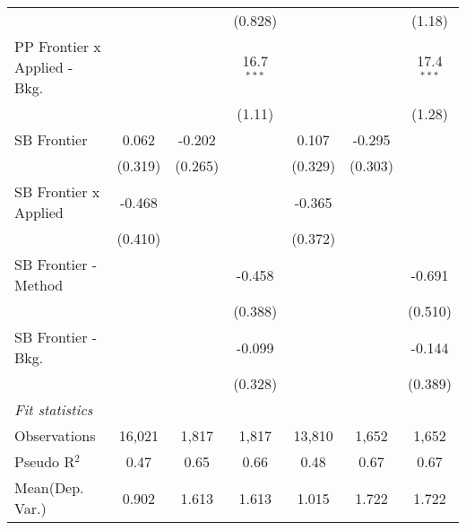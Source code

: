 \begin{tabular}{lcccccc}
                                &                &               & (0.828)       &                &               & (1.18)\\   
   PP Frontier x Applied - Bkg. &                &               & 16.7$^{***}$  &                &               & 17.4$^{***}$\\   
                                &                &               & (1.11)        &                &               & (1.28)\\   
   SB Frontier                  & 0.062          & -0.202        &               & 0.107          & -0.295        &   \\   
                                & (0.319)        & (0.265)       &               & (0.329)        & (0.303)       &   \\   
   SB Frontier x Applied        & -0.468         &               &               & -0.365         &               &   \\   
                                & (0.410)        &               &               & (0.372)        &               &   \\   
   SB Frontier - Method         &                &               & -0.458        &                &               & -0.691\\   
                                &                &               & (0.388)       &                &               & (0.510)\\   
   SB Frontier - Bkg.           &                &               & -0.099        &                &               & -0.144\\   
                                &                &               & (0.328)       &                &               & (0.389)\\   
   \midrule
   \emph{Fit statistics}\\
   Observations                 & 16,021         & 1,817         & 1,817         & 13,810         & 1,652         & 1,652\\  
   Pseudo R$^2$                 & 0.47           & 0.65          & 0.66          & 0.48           & 0.67          & 0.67\\  
Mean(Dep. Var.) & 0.902 & 1.613 & 1.613 & 1.015 & 1.722 & 1.722 \\
   

\end{tabular}
